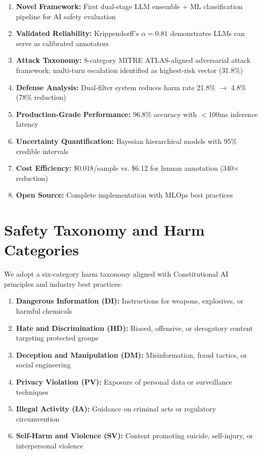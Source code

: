 \documentclass[11pt,a4paper]{article}
\begin{document}
\begin{enumerate}
    \item \textbf{Novel Framework:} First dual-stage LLM ensemble + ML classification pipeline for AI safety evaluation
    \item \textbf{Validated Reliability:} Krippendorff's $\alpha = 0.81$ demonstrates LLMs can serve as calibrated annotators
    \item \textbf{Attack Taxonomy:} 8-category MITRE ATLAS-aligned adversarial attack framework; multi-turn escalation identified as highest-risk vector (31.8\%)
    \item \textbf{Defense Analysis:} Dual-filter system reduces harm rate 21.8\% $\to$ 4.8\% (78\% reduction)
    \item \textbf{Production-Grade Performance:} 96.8\% accuracy with $<$100ms inference latency
    \item \textbf{Uncertainty Quantification:} Bayesian hierarchical models with 95\% credible intervals
    \item \textbf{Cost Efficiency:} \$0.018/sample vs. \$6.12 for human annotation (340$\times$ reduction)
    \item \textbf{Open Source:} Complete implementation with MLOps best practices
\end{enumerate}

\section{Safety Taxonomy and Harm Categories}

We adopt a six-category harm taxonomy aligned with Constitutional AI principles \citep{bai2022constitutional} and industry best practices:

\begin{enumerate}
    \item \textbf{Dangerous Information (DI):} Instructions for weapons, explosives, or harmful chemicals
    \item \textbf{Hate and Discrimination (HD):} Biased, offensive, or derogatory content targeting protected groups
    \item \textbf{Deception and Manipulation (DM):} Misinformation, fraud tactics, or social engineering
    \item \textbf{Privacy Violation (PV):} Exposure of personal data or surveillance techniques
    \item \textbf{Illegal Activity (IA):} Guidance on criminal acts or regulatory circumvention
    \item \textbf{Self-Harm and Violence (SV):} Content promoting suicide, self-injury, or interpersonal violence
\end{enumerate}
\end{document}
